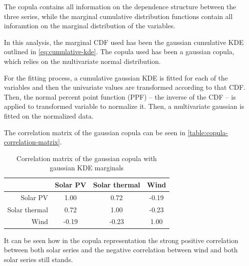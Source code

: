 The copula contains all information on the dependence structure between the three series, while the marginal cumulative distribution functions contain all inforamtion on the marginal distribution of the variables. 

In this analysis, the marginal CDF used has been the gaussian cumulative KDE outlined in \eqref{eq:cumulative-kde}. The copula used has been a gaussian copula, which relies on the multivariate normal distribution.

For the fitting process, a cumulative gaussian KDE is fitted for each of the variables and then the univariate values are transformed according to that CDF. Then, the normal percent point function (PPF) -- the inverse of the CDF -- is applied to transformed variable to normalize it. Then, a multivariate gaussian is fitted on the normalized data. 

The correlation matrix of the gaussian copula can be seen in \autoref{table:copula-correlation-matrix}.

\begin{table}[ht]
    \centering
    \begin{tabular}{r|ccc}
        & Solar PV & Solar thermal & Wind \\
        \midrule
        Solar PV & 1.00 & 0.72 & -0.19 \\
        Solar thermal & 0.72 & 1.00 & -0.23 \\
        Wind & -0.19 & -0.23 & 1.00 \\
    \end{tabular}
    \caption{Correlation matrix of the gaussian copula with gaussian KDE marginals}
    \label{table:copula-correlation-matrix}
\end{table}

It can be seen how in the copula representation the strong positive correlation between both solar series and the negative correlation between wind and both solar series still stands. 

